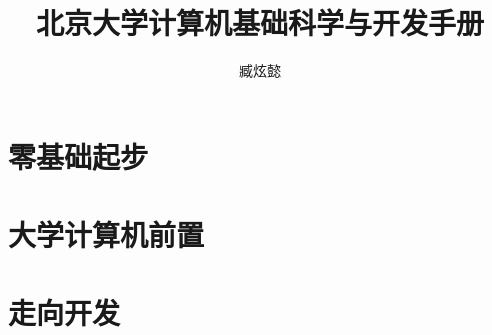 \documentclass[lang=cn, color=blue, titlestyle=hang, scheme=chinese, 12pt]{elegantbook}
\title{北京大学计算机基础科学与开发手册}
\author{臧炫懿}
\institute{北京大学信息科学技术学院、北京大学学生Linux俱乐部}
\begin{document}
\maketitle

\frontmatter



\mainmatter

\tableofcontents


\part{零基础起步}









\part{大学计算机前置}









\part{走向开发}





\appendix







\backmatter


\end{document}

